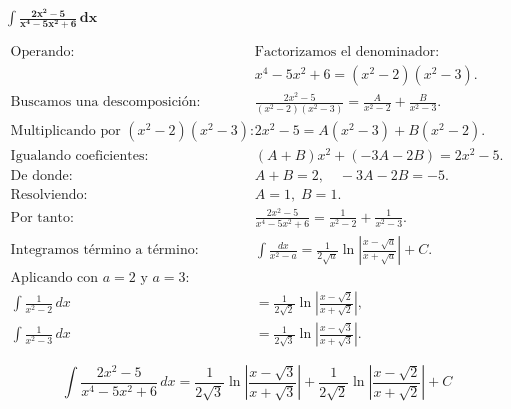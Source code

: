 $\displaystyle \mathbf{\int \frac{2x^{2}-5}{x^{4}-5x^{2}+6}\,dx}$

\nopagebreak
$$
\begin{aligned}
\text{Operando: } &
\text{Factorizamos el denominador: } \\[4pt]
&x^{4}-5x^{2}+6=(x^{2}-2)(x^{2}-3). \\[6pt]
\text{Buscamos una descomposición: } &
\frac{2x^{2}-5}{(x^{2}-2)(x^{2}-3)}
= \frac{A}{x^{2}-2} + \frac{B}{x^{2}-3}. \\[6pt]
\text{Multiplicando por }(x^{2}-2)(x^{2}-3): &
2x^{2}-5 = A(x^{2}-3) + B(x^{2}-2). \\[6pt]
\text{Igualando coeficientes: } &
(A+B)x^{2} + (-3A-2B) = 2x^{2}-5. \\[4pt]
\text{De donde: } &A+B=2,\quad -3A-2B=-5. \\[4pt]
\text{Resolviendo: } &A=1,\; B=1. \\[8pt]
\text{Por tanto: } &
\frac{2x^{2}-5}{x^{4}-5x^{2}+6}
= \frac{1}{x^{2}-2} + \frac{1}{x^{2}-3}. \\[8pt]
\text{Integramos término a término: } &
\int \frac{dx}{x^{2}-a}
= \frac{1}{2\sqrt{a}}\ln\!\left|\frac{x-\sqrt{a}}{x+\sqrt{a}}\right| + C.
\\[6pt]
\text{Aplicando con } a=2 \text{ y } a=3: &\\[4pt]
\int \frac{1}{x^{2}-2}\,dx
&= \frac{1}{2\sqrt{2}}\ln\!\left|\frac{x-\sqrt{2}}{x+\sqrt{2}}\right|, \\[4pt]
\int \frac{1}{x^{2}-3}\,dx
&= \frac{1}{2\sqrt{3}}\ln\!\left|\frac{x-\sqrt{3}}{x+\sqrt{3}}\right|.
\end{aligned}
$$

$$
\boxed{\displaystyle 
\int \frac{2x^{2}-5}{x^{4}-5x^{2}+6}\,dx
= \frac{1}{2\sqrt{3}}\ln\!\left|\frac{x-\sqrt{3}}{x+\sqrt{3}}\right|
+ \frac{1}{2\sqrt{2}}\ln\!\left|\frac{x-\sqrt{2}}{x+\sqrt{2}}\right| + C}
$$
